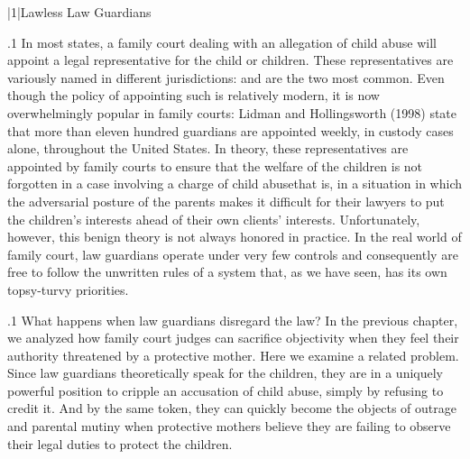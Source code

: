 \documentclass[11pt, twoside]{article}
\begin{document}
\thispagestyle{empty}

{\fontsize{13}{19}\selectfont


\hspace{-5em}\begin{minipage}{1.1\textwidth}
\begin{flushright}
{\fontsize{14}{22}\selectfont
\textbf{%
}
}
\end{flushright}
\end{minipage}


\vspace{6em}





\s|1|{Lawless Law Guardians}

\p.1{%
\noindent{}In most states, a family court dealing with an allegation of child abuse
will appoint a legal representative for the child or children. These representatives are variously named in different jurisdictions: 
and  are the two most common. Even though the
policy of appointing such  is relatively modern, it is now
overwhelmingly popular in family courts: Lidman and Hollingsworth
(1998) state that more than eleven hundred guardians are appointed
weekly, in custody cases alone, throughout the United States. In theory, these representatives are appointed by family courts to ensure that
the welfare of the children is not forgotten in a case involving a charge
of child abuse\mdash{}that is, in a situation in which the adversarial posture
of the parents makes it difficult for their lawyers to put the children’s
interests ahead of their own clients’ interests. Unfortunately, however,
this benign theory is not always honored in practice. In the real world
of family court, law guardians operate under very few controls and consequently are free to follow the unwritten rules of a system that, as we
have seen, has its own topsy-turvy priorities.
}%

\p.1{%
What happens when law guardians disregard the law? In the previous
chapter, we analyzed how family court judges can sacrifice objectivity when they feel their authority threatened by a protective mother.
Here we examine a related problem. Since law guardians theoretically speak for the children, they are in a uniquely powerful position
to cripple an accusation of child abuse, simply by refusing to credit it.
And by the same token, they can quickly become the objects of outrage
and parental mutiny when protective mothers believe they are failing to
observe their legal duties to protect the children.
}%

}
\end{document}
